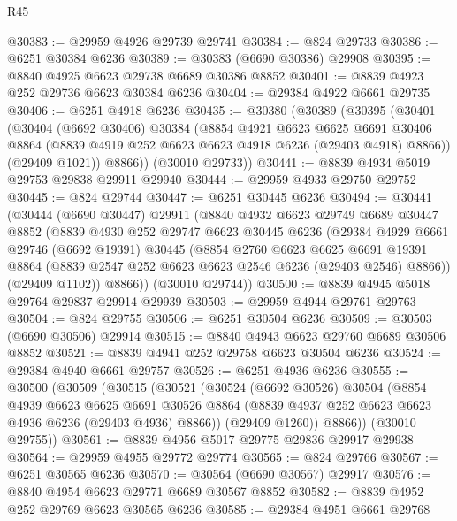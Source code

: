 \begin{lexlean}{R45}
\begin{coremodule}
{@30383 := @29959 @4926 @29739 @29741
@30384 := @824 @29733
@30386 := @6251 @30384 @6236
@30389 := @30383 (@6690 @30386) @29908
@30395 := @8840 @4925 @6623 @29738 @6689 @30386 @8852
@30401 := @8839 @4923 @252 @29736 @6623 @30384 @6236
@30404 := @29384 @4922 @6661 @29735
@30406 := @6251 @4918 @6236
@30435 := @30380
    (@30389
      (@30395
        (@30401
          (@30404
            (@6692 @30406)
            @30384
            (@8854
              @4921
              @6623
              @6625
              @6691
              @30406
              @8864
              (@8839 @4919 @252 @6623 @6623 @4918 @6236 (@29403 @4918) @8866))
            (@29409 @1021))
          @8866))
      (@30010 @29733))
@30441 := @8839 @4934 @5019 @29753 @29838 @29911 @29940
@30444 := @29959 @4933 @29750 @29752
@30445 := @824 @29744
@30447 := @6251 @30445 @6236
@30494 := @30441
    (@30444
      (@6690 @30447)
      @29911
      (@8840
        @4932
        @6623
        @29749
        @6689
        @30447
        @8852
        (@8839
          @4930
          @252
          @29747
          @6623
          @30445
          @6236
          (@29384
            @4929
            @6661
            @29746
            (@6692 @19391)
            @30445
            (@8854
              @2760
              @6623
              @6625
              @6691
              @19391
              @8864
              (@8839 @2547 @252 @6623 @6623 @2546 @6236 (@29403 @2546) @8866))
            (@29409 @1102))
          @8866))
      (@30010 @29744))
@30500 := @8839 @4945 @5018 @29764 @29837 @29914 @29939
@30503 := @29959 @4944 @29761 @29763
@30504 := @824 @29755
@30506 := @6251 @30504 @6236
@30509 := @30503 (@6690 @30506) @29914
@30515 := @8840 @4943 @6623 @29760 @6689 @30506 @8852
@30521 := @8839 @4941 @252 @29758 @6623 @30504 @6236
@30524 := @29384 @4940 @6661 @29757
@30526 := @6251 @4936 @6236
@30555 := @30500
    (@30509
      (@30515
        (@30521
          (@30524
            (@6692 @30526)
            @30504
            (@8854
              @4939
              @6623
              @6625
              @6691
              @30526
              @8864
              (@8839 @4937 @252 @6623 @6623 @4936 @6236 (@29403 @4936) @8866))
            (@29409 @1260))
          @8866))
      (@30010 @29755))
@30561 := @8839 @4956 @5017 @29775 @29836 @29917 @29938
@30564 := @29959 @4955 @29772 @29774
@30565 := @824 @29766
@30567 := @6251 @30565 @6236
@30570 := @30564 (@6690 @30567) @29917
@30576 := @8840 @4954 @6623 @29771 @6689 @30567 @8852
@30582 := @8839 @4952 @252 @29769 @6623 @30565 @6236
@30585 := @29384 @4951 @6661 @29768
}
\end{coremodule}
\end{lexlean}
